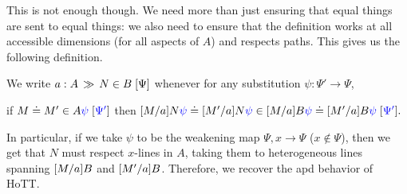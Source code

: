 \documentclass{article}
\begin{document}
This is not enough though. We need more than just ensuring that equal things
are sent to equal things: we also need to ensure that the definition works at all
accessible dimensions (for all aspects of $A$) and respects paths. This gives
us the following definition.

\begin{definition*} We write $a : A \, \gg \, N \in B \; [\Psi]$ whenever
  for any substitution $\psi : \Psi' \to \Psi$, 
  \begin{center}
  if 
  $M \doteq M' \in A{\color{blue} \psi} \; [{\color{blue} \Psi'}]$ then
  $[M/a]N{\color{blue} \psi} \doteq [M'/a]N{\color{blue} \psi} \in [M/a]B{\color{blue} \psi} \doteq [M'/a]B{\color{blue} \psi} \; [{\color{blue} \Psi'}].$
  \end{center} 
\end{definition*}
In particular, if we take $\psi$ to be the weakening map $\Psi, x \to \Psi$
($x \notin \Psi$), then we get that $N$ must respect $x$-lines in $A$, taking
them to heterogeneous lines spanning $[M/a]B$ and $[M'/a]B$.
Therefore, we recover the \textsf{apd} behavior of HoTT.

\bigskip


\nocite{HoTTBook:13}
\nocite{Angiuli:chtt3:17}
\nocite{Angiuli:chtt:17}



\end{document}
